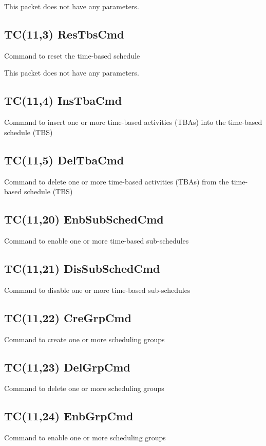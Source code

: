 This packet does not have any parameters.

\pagebreak
\subsection{TC(11,3) ResTbsCmd}
Command to reset the time-based schedule

This packet does not have any parameters.

\pagebreak
\subsection{TC(11,4) InsTbaCmd}
Command to insert one or more time-based activities (TBAs) into the time-based schedule (TBS)

\pagebreak
\subsection{TC(11,5) DelTbaCmd}
Command to delete one or more time-based activities (TBAs) from the time-based schedule (TBS)

\pagebreak
\subsection{TC(11,20) EnbSubSchedCmd}
Command to enable one or more time-based sub-schedules

\pagebreak
\subsection{TC(11,21) DisSubSchedCmd}
Command to disable one or more time-based sub-schedules

\pagebreak
\subsection{TC(11,22) CreGrpCmd}
Command to create one or more scheduling groups

\pagebreak
\subsection{TC(11,23) DelGrpCmd}
Command to delete one or more scheduling groups

\pagebreak
\subsection{TC(11,24) EnbGrpCmd}
Command to enable one or more scheduling groups


